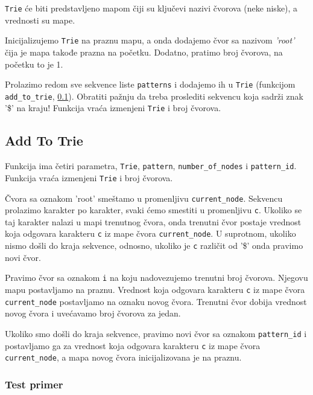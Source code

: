 \texttt{Trie} će biti predstavljeno mapom čiji su ključevi nazivi čvorova (neke niske), a vrednosti su mape.

Inicijalizujemo \texttt{Trie} na praznu mapu, a onda dodajemo čvor sa nazivom \textit{'root'} čija je mapa takođe prazna na početku. Dodatno, pratimo broj čvorova, na početku to je 1.

Prolazimo redom sve sekvence liste \texttt{patterns} i dodajemo ih u \texttt{Trie} (funkcijom \texttt{add\_to\_trie}, \ref{addToTrie}). Obratiti pažnju da treba proslediti sekvencu koja sadrži znak '\$' na kraju! Funkcija vraća izmenjeni \texttt{Trie} i broj čvorova.





\subsection{Add To Trie}
\label{addToTrie}

Funkcija ima četiri parametra, \texttt{Trie}, \texttt{pattern}, \texttt{number\_of\_nodes} i \texttt{pattern\_id}. Funkcija vraća izmenjeni \texttt{Trie} i broj čvorova.

Čvora sa oznakom 'root' smeštamo u promenljivu \texttt{current\_node}. Sekvencu prolazimo karakter po karakter, svaki ćemo smestiti u promenljivu \texttt{c}. Ukoliko se taj karakter nalazi u mapi trenutnog čvora, onda trenutni čvor postaje vrednost koja odgovara karakteru \texttt{c} iz mape čvora \texttt{current\_node}. U suprotnom, ukoliko nismo došli do kraja sekvence, odnosno, ukoliko je \texttt{c} različit od '\$' onda pravimo novi čvor.

Pravimo čvor sa oznakom \texttt{i} na koju nadovezujemo trenutni broj čvorova. Njegovu mapu postavljamo na praznu. Vrednost koja odgovara karakteru \texttt{c} iz mape čvora \texttt{current\_node} postavljamo na oznaku novog čvora. Trenutni čvor dobija vrednost novog čvora i uvećavamo broj čvorova za jedan.

Ukoliko smo došli do kraja sekvence, pravimo novi čvor sa oznakom \texttt{pattern\_id} i postavljamo ga za vrednost koja odgovara karakteru \texttt{c} iz mape čvora \texttt{current\_node}, a mapa novog čvora inicijalizovana je na praznu.




\subsubsection{Test primer}

